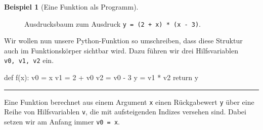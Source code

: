 \documentclass[
  letterpaper,
  DIV=11,
  oneside]{scrreprt}
\newenvironment{Shaded}{\begin{snugshade}}{\end{snugshade}}
\newcommand{\ControlFlowTok}[1]{\textcolor[rgb]{0.00,0.23,0.31}{#1}}
\newcommand{\DecValTok}[1]{\textcolor[rgb]{0.68,0.00,0.00}{#1}}
\newcommand{\KeywordTok}[1]{\textcolor[rgb]{0.00,0.23,0.31}{#1}}
\newcommand{\NormalTok}[1]{\textcolor[rgb]{0.00,0.23,0.31}{#1}}
\newcommand{\OperatorTok}[1]{\textcolor[rgb]{0.37,0.37,0.37}{#1}}
\theoremstyle{definition}
\theoremstyle{definition}
\newtheorem{example}{Beispiel}[chapter]
\theoremstyle{remark}
\begin{document}
\begin{example}[Eine Funktion als
Programm]
\begin{figure}
{\begin{figure}[H]
{}

\end{figure}

}

\caption{\label{fig-compTreeSimple}Ausdrucksbaum zum Ausdruck
\texttt{y\ =\ (2\ +\ x)\ *\ (x\ -\ 3)}.}

\end{figure}

Wir wollen nun unsere Python-Funktion so umschreiben, dass diese
Struktur auch im Funktionskörper sichtbar wird. Dazu führen wir drei
Hilfsvariablen \texttt{v0,\ v1,\ v2} ein.

\begin{Shaded}
\begin{Highlighting}[]
\KeywordTok{def}\NormalTok{ f(x):}
\NormalTok{    v0 }\OperatorTok{=}\NormalTok{ x}
\NormalTok{    v1 }\OperatorTok{=} \DecValTok{2} \OperatorTok{+}\NormalTok{ v0}
\NormalTok{    v2 }\OperatorTok{=}\NormalTok{ v0 }\OperatorTok{{-}} \DecValTok{3}
\NormalTok{    y }\OperatorTok{=}\NormalTok{ v1 }\OperatorTok{*}\NormalTok{ v2}
    \ControlFlowTok{return}\NormalTok{ y}
\end{Highlighting}
\end{Shaded}

\end{example}

\begin{center}\rule{0.5\linewidth}{0.5pt}\end{center}

\begin{tcolorbox}[enhanced jigsaw, colframe=quarto-callout-important-color-frame, colback=white, opacityback=0, toptitle=1mm, bottomrule=.15mm, breakable, title=\textcolor{quarto-callout-important-color}{\faExclamation}\hspace{0.5em}{Konvention}, toprule=.15mm, colbacktitle=quarto-callout-important-color!10!white, leftrule=.75mm, titlerule=0mm, coltitle=black, bottomtitle=1mm, arc=.35mm, rightrule=.15mm, left=2mm, opacitybacktitle=0.6]

Eine Funktion berechnet aus einem Argument \texttt{x} einen Rückgabewert
\texttt{y} über eine Reihe von Hilfsvariablen \texttt{v}, die mit
aufsteigenden Indizes versehen sind. Dabei setzen wir am Anfang immer
\texttt{v0\ =\ x}.

\end{tcolorbox}
\end{document}
